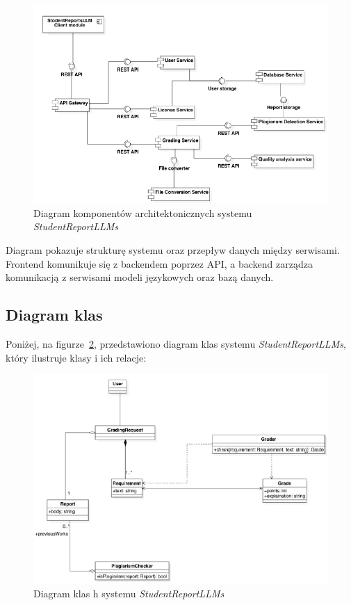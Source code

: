 \documentclass[a4paper, 12pt]{article}
\begin{document}
\begin{figure}[H]
    \centering
    \includegraphics[width=\textwidth]{img/component_diagram}
    \caption{Diagram komponentów architektonicznych systemu \textit{StudentReportLLMs}}
    \label{fig:architecture}
\end{figure}

Diagram pokazuje strukturę systemu oraz przepływ danych między serwisami. Frontend komunikuje się z backendem poprzez API, a backend zarządza komunikacją z serwisami modeli językowych oraz bazą danych.

\subsection{Diagram klas}
Poniżej, na figurze~\ref{fig:class-diagram}, przedstawiono diagram klas systemu \textit{StudentReportLLMs}, który ilustruje klasy i ich relacje:
\begin{figure}[H]
    \centering
    \includegraphics[width=\textwidth]{img/class_diagram}
    \caption{Diagram klas h systemu \textit{StudentReportLLMs}}
    \label{fig:class-diagram}
\end{figure}
\end{document}
